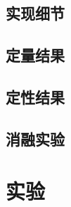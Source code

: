 \subsection{实现细节}




\subsection{定量结果}




\subsection{定性结果}




\subsection{消融实验}



\section{实验}
